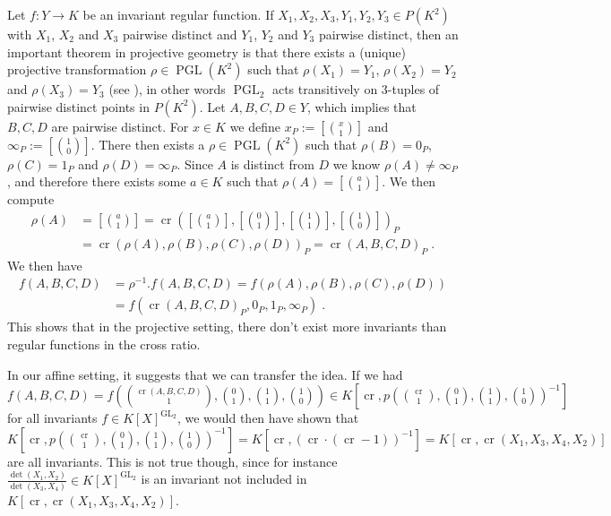 Let $f \colon Y \longrightarrow K$ be an invariant regular function.
If \mbox{$X_1,X_2,X_3,Y_1,Y_2,Y_3 \in P(K^2)$} with $X_1$, $X_2$ and $X_3$ pairwise distinct and $Y_1$, $Y_2$ and $Y_3$ pairwise distinct, then an important theorem in projective geometry is that there exists a (unique) projective transformation $ \rho \in \operatorname{PGL}(K^2)$ such that $\rho (X_1) = Y_1$, $\rho(X_2) = Y_2$ and $\rho(X_3) = Y_3$ (see \cite[prop 5.6]{Aud03}), in other words $\operatorname{PGL}_2$ acts transitively on $3$-tuples of pairwise distinct points in $P(K^2) $.
Let $A,B,C,D \in Y$, which implies that $B,C,D$ are pairwise distinct.
For $x \in K $ we define $x_P := \left[\binom{x}{1}\right]$ and $\infty_P := \left[\binom{1}{0}\right]$.
There then exists a $\rho \in \operatorname{PGL}(K^2)$ such that $\rho (B) = 0_P$, $\rho (C) = 1_P$ and $\rho (D) = \infty_P$.
Since $A$ is distinct from $D$ we know $\rho (A) \neq \infty_P$, and therefore there exists some $a \in K$ such that $\rho(A) = [\binom{a}{1}]$.
We then compute
\begin{equation*}
  \begin{aligned}
    \rho (A)
    &= \left[\binom{a}{1}\right]
    = \operatorname{cr}\left(\left[\binom{a}{1}\right],\left[\binom{0}{1}\right],\left[\binom{1}{1}\right],\left[\binom{1}{0}\right]\right)_P\\
    &= \operatorname{cr}(\rho(A),\rho(B),\rho(C),\rho(D))_P = \operatorname{cr}(A,B,C,D)_P \; .
  \end{aligned}
\end{equation*}
We then have
\begin{equation*}
  \begin{aligned}
    f(A,B,C,D)
    &= \rho^{-1}.f (A,B,C,D)
    = f(\rho(A),\rho(B),\rho(C),\rho(D)) \\
    &= f(\operatorname{cr}(A,B,C,D)_P,0_P,1_P,\infty_P) \; .
  \end{aligned}
\end{equation*}
This shows that in the projective setting, there don't exist more invariants than regular functions in the cross ratio.

In our affine setting, it suggests that we can transfer the idea.
If we had $f(A,B,C,D)=f(\binom{\operatorname{cr}(A,B,C,D)}{1},\binom{0}{1},\binom{1}{1},\binom{1}{0}) \in K[\operatorname{cr},p(\binom{\operatorname{cr}}{1},\binom{0}{1},\binom{1}{1},\binom{1}{0})^{-1}]$ for all invariants $f \in K[X]^{\operatorname{GL}_2}$, we would then have shown that \linebreak$K[\operatorname{cr},p(\binom{\operatorname{cr}}{1},\binom{0}{1},\binom{1}{1},\binom{1}{0})^{-1}] = K[\operatorname{cr},(\operatorname{cr}\cdot(\operatorname{cr}-1))^{-1}] = K[\operatorname{cr},\operatorname{cr}(X_1,X_3,X_4,X_2)]$ are all invariants.
This is not true though, since for instance \linebreak$\frac{\operatorname{det}(X_1,X_2)}{\operatorname{det}(X_3,X_4)} \in K[X]^{\operatorname{GL}_2}$ is an invariant not included in $K[\operatorname{cr},\operatorname{cr}(X_1,X_3,X_4,X_2)]$.

